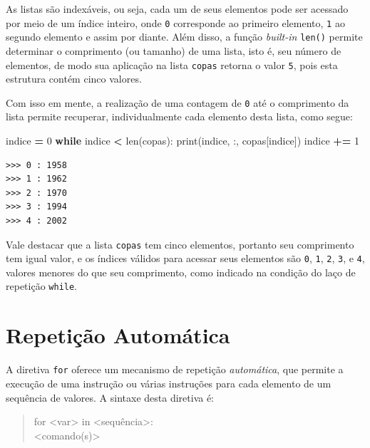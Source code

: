\documentclass[
]{book}
\newenvironment{Shaded}{\begin{snugshade}}{\end{snugshade}}
\newcommand{\BuiltInTok}[1]{#1}
\newcommand{\ControlFlowTok}[1]{\textcolor[rgb]{0.13,0.29,0.53}{\textbf{#1}}}
\newcommand{\DecValTok}[1]{\textcolor[rgb]{0.00,0.00,0.81}{#1}}
\newcommand{\NormalTok}[1]{#1}
\newcommand{\OperatorTok}[1]{\textcolor[rgb]{0.81,0.36,0.00}{\textbf{#1}}}
\newcommand{\StringTok}[1]{\textcolor[rgb]{0.31,0.60,0.02}{#1}}
\begin{document}
As listas são indexáveis, ou seja, cada um de seus elementos pode ser acessado por meio de um índice inteiro, onde \texttt{0} corresponde ao primeiro elemento, \texttt{1} ao segundo elemento e assim por diante. Além disso, a função \emph{built-in} \texttt{len()} permite determinar o comprimento (ou tamanho) de uma lista, isto é, seu número de elementos, de modo sua aplicação na lista \texttt{copas} retorna o valor \texttt{5}, pois esta estrutura contém cinco valores.

Com isso em mente, a realização de uma contagem de \texttt{0} até o comprimento da lista permite recuperar, individualmente cada elemento desta lista, como segue:

\begin{Shaded}
\begin{Highlighting}[]
\NormalTok{indice }\OperatorTok{=} \DecValTok{0}
\ControlFlowTok{while}\NormalTok{ indice }\OperatorTok{\textless{}} \BuiltInTok{len}\NormalTok{(copas):}
    \BuiltInTok{print}\NormalTok{(indice, }\StringTok{\textquotesingle{}:\textquotesingle{}}\NormalTok{, copas[indice])}
\NormalTok{    indice }\OperatorTok{+=} \DecValTok{1}
\end{Highlighting}
\end{Shaded}

\begin{verbatim}
>>> 0 : 1958
>>> 1 : 1962
>>> 2 : 1970
>>> 3 : 1994
>>> 4 : 2002
\end{verbatim}

Vale destacar que a lista \texttt{copas} tem cinco elementos, portanto seu comprimento tem igual valor, e os índices válidos para acessar seus elementos são \texttt{0}, \texttt{1}, \texttt{2}, \texttt{3}, e \texttt{4}, valores menores do que seu comprimento, como indicado na condição do laço de repetição \texttt{while}.

\hypertarget{repet-for}{%
\section{Repetição Automática}\label{repet-for}}

A diretiva \texttt{for} oferece um mecanismo de repetição \emph{automática}, que permite a execução de uma instrução ou várias instruções para cada elemento de um sequência de valores. A sintaxe desta diretiva é:

\begin{quote}
for \textless var\textgreater{} in \textless sequência\textgreater:\\
\hspace*{0.333em}\hspace*{0.333em}\hspace*{0.333em}\hspace*{0.333em}\hspace*{0.333em}\textless comando(s)\textgreater{}
\end{quote}
\end{document}
